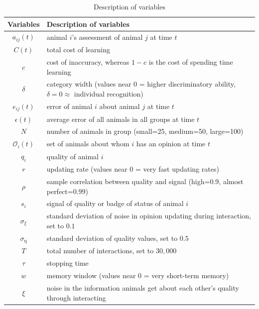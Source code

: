 %
\begin {table}[ht]
\caption {Description of variables} \label{tab:vars} 
\begin{tabular}{cl}

 Variables & Description of variables \\
\midrule 
$a_{ij}(t)$ & animal $i$'s assessment of animal $j$ at time $t$ \\
$C(t)$ & total cost of learning \\ 
$c$ & cost of inaccuracy, whereas $1-c$ is the cost of spending time learning \\ 
$\delta$ & category width (values near 0 = higher discriminatory ability, $\delta=0 \approx$ individual recognition)\\
$e_{ij}(t)$ & error of animal $i$ about animal $j$ at time $t$\\
$\epsilon(t)$ & average error of all animals in all groups at time $t$ \\
$N$ & number of animals in group (small=25, medium=50, large=100)\\ 
$\mathscr{O}_i(t)$ & set of animals about whom $i$ has an opinion at time $t$\\
$q_i$ & quality of animal $i$ \\ 
$r$ & updating rate (values near 0 = very fast updating rates)\\
$\rho$ & sample correlation between quality and signal (high=0.9, almost perfect=0.99)\\
$s_i$ & signal of quality or badge of status of animal $i$ \\ 
$\sigma_\xi$ & standard deviation of noise in opinion updating during interaction, set to $0.1$ \\
$\sigma_\text{q}$ & standard deviation of quality values, set to $0.5$ \\
$T$ & total number of interactions, set to $30,000$ \\
$\tau$ & stopping time \\
$w$ & memory window (values near 0 = very short-term memory)\\
$\xi$ & noise in the information animals get about each other's quality through interacting
\end{tabular}
\end {table}


